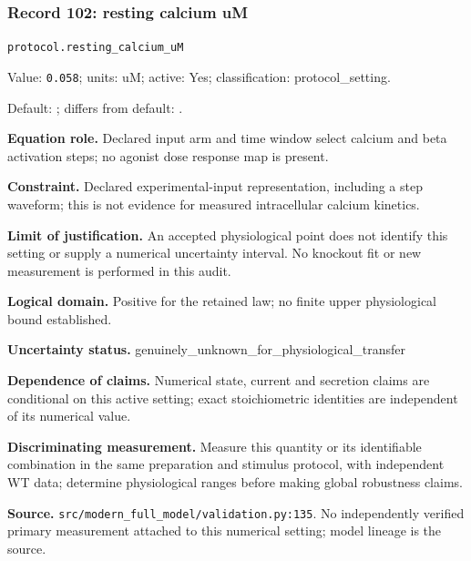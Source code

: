 \subsubsection*{Record 102: resting calcium uM}
{\small \nolinkurl{protocol.resting_calcium_uM}\par

Value: \texttt{0.058}; units: uM; active: Yes; classification: protocol\_setting.\par

Default: ; differs from default: .\par

\textbf{Equation role.} Declared input arm and time window select calcium and beta activation steps; no agonist dose response map is present.\par

\textbf{Constraint.} Declared experimental-input representation, including a step waveform; this is not evidence for measured intracellular calcium kinetics.\par

\textbf{Limit of justification.} An accepted physiological point does not identify this setting or supply a numerical uncertainty interval. No knockout fit or new measurement is performed in this audit.\par

\textbf{Logical domain.} Positive for the retained law; no finite upper physiological bound established.\par

\textbf{Uncertainty status.} genuinely\_unknown\_for\_physiological\_transfer\par

\textbf{Dependence of claims.} Numerical state, current and secretion claims are conditional on this active setting; exact stoichiometric identities are independent of its numerical value.\par

\textbf{Discriminating measurement.} Measure this quantity or its identifiable combination in the same preparation and stimulus protocol, with independent WT data; determine physiological ranges before making global robustness claims.\par

\textbf{Source.} \nolinkurl{src/modern_full_model/validation.py:135}. No independently verified primary measurement attached to this numerical setting; model lineage is the source.\par}


